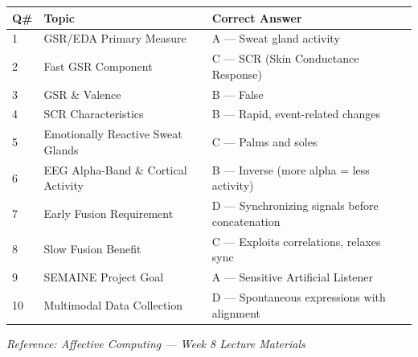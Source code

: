 \documentclass[11pt,a4paper]{article}
\newcommand{\bb}[1]{\textbf{#1}}
\begin{document}
\begin{center}
\renewcommand{\arraystretch}{1.4}
\begin{tabular}{|L{0.8cm}|L{6.2cm}|L{8.2cm}|}
\hline
\bb{Q\#} & \bb{Topic} & \bb{Correct Answer} \\
 & GSR/EDA Primary Measure & A --- Sweat gland activity \\
2 & Fast GSR Component & C --- SCR (Skin Conductance Response) \\
3 & GSR \& Valence & B --- False \\
4 & SCR Characteristics & B --- Rapid, event-related changes \\
5 & Emotionally Reactive Sweat Glands & C --- Palms and soles \\
6 & EEG Alpha-Band \& Cortical Activity & B --- Inverse (more alpha = less activity) \\
7 & Early Fusion Requirement & D --- Synchronizing signals before concatenation \\
8 & Slow Fusion Benefit & C --- Exploits correlations, relaxes sync \\
9 & SEMAINE Project Goal & A --- Sensitive Artificial Listener \\
10 & Multimodal Data Collection & D --- Spontaneous expressions with alignment \\
\hline
\end{tabular}
\end{center}

\medskip
{\small\textit{Reference: Affective Computing --- Week 8 Lecture Materials}}
\end{document}
